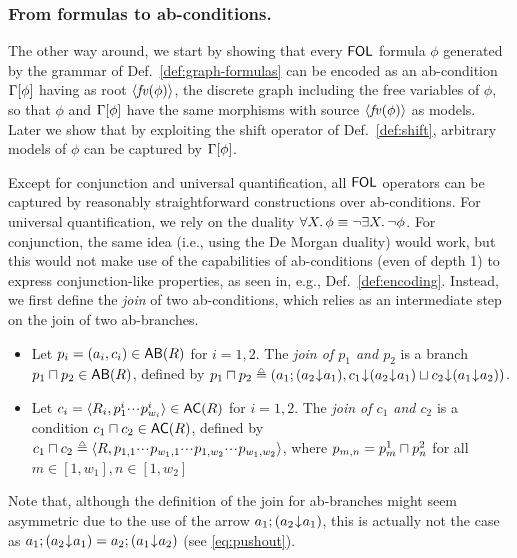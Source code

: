 \subsubsection{From formulas to ab-conditions.} 

The other way around, we start by showing that every $\mathsf{FOL}$ formula $\phi$ generated by the grammar of Def.~\ref{def:graph-formulas} can be encoded as an ab-condition $\Gamma[{\phi}]$ having as root $\langle \mathit{fv}(\phi) \rangle$, the discrete graph including the free variables of $\phi$, so that $\phi$ and $\Gamma[{\phi}]$ have the same morphisms with source $\langle \mathit{fv}(\phi) \rangle$ as models. Later we show that by exploiting the shift operator of Def.~\ref{def:shift}, arbitrary models of $\phi$ can be captured by $\Gamma[{\phi}]$.  

Except for conjunction and universal quantification, all $\mathsf{FOL}$ operators can be captured by reasonably straightforward constructions over ab-conditions. For universal quantification, we rely on the duality $\forall X.\, \phi\equiv \neg\exists X.\, \neg\phi$. For conjunction, the same idea (i.e., using the De Morgan duality) would work, but this would not make use of the capabilities of ab-conditions (even of depth 1) to express conjunction-like properties, as seen in, e.g., Def.~\ref{def:encoding}. Instead, we first define the \emph{join} of two ab-conditions, which relies as an intermediate step on the join of two ab-branches.
%
\begin{definition}\label{def:join}
\begin{itemize}[defsep]
\item Let $p_i=(a_i,c_i)\in \AB R$ for $i=1,2$. The \emph{join of $p_1$ and $p_2$} is a branch $p_1\join p_2\in \AB R$, defined by $p_1\join p_2 \isdef (a_1;(a_2\tdarr a_1),\shift{c_1}{(a_2\tdarr a_1)}\merge \shift{c_2}{(a_1\tdarr a_2)})$.

\item Let $c_i=\tupof{R_i,p^i_1\ccdots p^i_{w_i}} \in \AC R$ for $i=1,2$. The \emph{join of $c_1$ and $c_2$} is a condition $c_1\join c_2\in \AC R$, defined by $c_1\join c_2\isdef \tupof{R,p_{1,1}\ccdots p_{w_1,1}\ccdots p_{1,w_2}\ccdots p_{w_1,w_2}}$, where $p_{m,n}=p^1_m\sqcap p^2_n$ for all $m\in [1,w_1], n\in [1,w_2]$ 
\end{itemize}
\end{definition}
%
Note that, although the definition of the join for ab-branches might seem asymmetric due to the use of the arrow $a_1;(a_2{\mskip1mu\downarrow\mskip1mu} a_1)$, this is actually not the case as $a_1;(a_2{\mskip1mu\downarrow\mskip1mu} a_1)=a_2;(a_1{\mskip1mu\downarrow\mskip1mu} a_2)$ (see \eqref{eq:pushout}).

